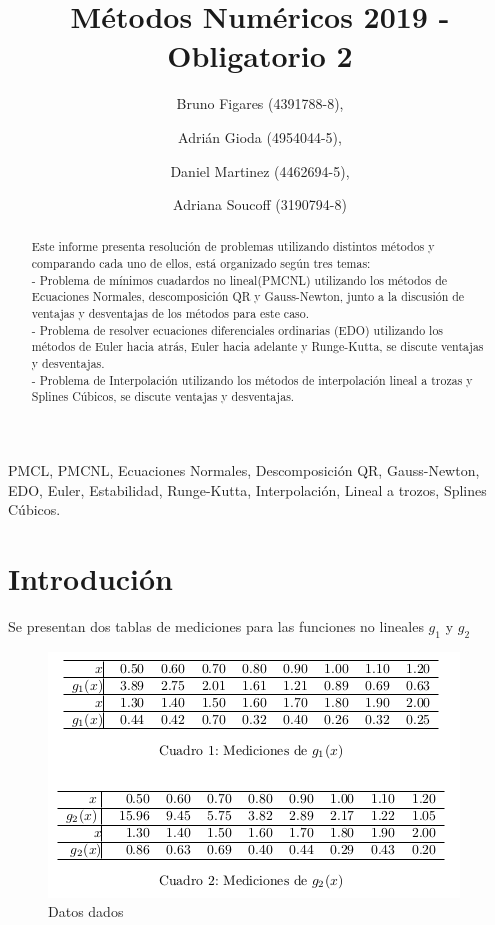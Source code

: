 \documentclass{endm}
\begin{document}
\begin{frontmatter}

\title{Métodos Numéricos 2019 - Obligatorio 2}

\author{Bruno Figares (4391788-8),}
\author{Adrián Gioda (4954044-5),}
\author{Daniel Martinez (4462694-5),}
\author{Adriana Soucoff (3190794-8)}

\address{Instituto de Matem\'atica y Estad\'istica\\ Facultad de Ingenier\'ia. Universidad de la Rep\'ublica\\ Montevideo, Uruguay}


\begin{abstract}
\setlength{\parindent}{12pt}
Este informe presenta resolución de problemas utilizando distintos métodos y comparando cada uno de ellos, está organizado según tres temas:\\
    - Problema de mínimos cuadardos no lineal(PMCNL) utilizando los métodos de Ecuaciones Normales, descomposición QR y Gauss-Newton, junto a la discusión de ventajas y desventajas de los métodos para este caso.\\
    - Problema de resolver ecuaciones diferenciales ordinarias (EDO) utilizando los métodos de Euler hacia atrás, Euler hacia adelante y Runge-Kutta, se discute ventajas y desventajas.\\
    - Problema de Interpolación utilizando los métodos de interpolación lineal a trozas y Splines Cúbicos, se discute ventajas y desventajas.
\end{abstract}

\begin{keyword}
PMCL, PMCNL, Ecuaciones Normales, Descomposición QR, Gauss-Newton, EDO, Euler, Estabilidad, Runge-Kutta, Interpolación, Lineal a trozos, Splines Cúbicos.
\end{keyword}
\end{frontmatter}

\section{Introdución}\label{intro}
Se presentan dos tablas de mediciones para las funciones no lineales $g_1$ y $g_2$ \\
\begin{figure}
    \includegraphics[width=\linewidth]{grillaini.png}
    \caption{Datos dados}
    \label{fig:datos}
\end{figure}\\
\end{document}
